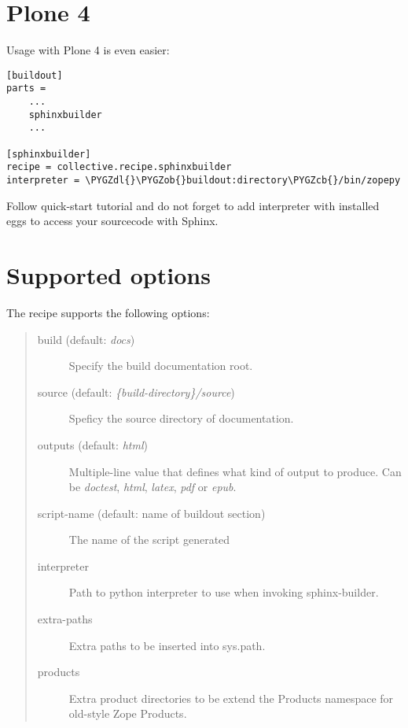 \documentclass[letterpaper,10pt,english]{sphinxmanual}
\def\PYGZob{\char`\{}
\def\PYGZcb{\char`\}}
\def\PYGZdl{\char`\$}
\begin{document}
\section{Plone 4}
\label{quick_start:plone-4}
Usage with Plone 4 is even easier:

\begin{Verbatim}[commandchars=\\\{\}]
[buildout]
parts =
    ...
    sphinxbuilder
    ...

[sphinxbuilder]
recipe = collective.recipe.sphinxbuilder
interpreter = \PYGZdl{}\PYGZob{}buildout:directory\PYGZcb{}/bin/zopepy
\end{Verbatim}

Follow quick-start tutorial and do not forget to add interpreter with
installed eggs to access your sourcecode with Sphinx.


\section{Supported options}
\label{options:supported-options}\label{options::doc}
The recipe supports the following options:
\begin{quote}
\begin{description}
\item[{build (default: \emph{docs})}] \leavevmode
Specify the build documentation root.

\item[{source (default: \emph{\{build-directory\}/source})}] \leavevmode
Speficy the source directory of documentation.

\item[{outputs (default: \emph{html})}] \leavevmode
Multiple-line value that defines what kind of output to produce.
Can be \emph{doctest}, \emph{html}, \emph{latex}, \emph{pdf} or \emph{epub}.

\item[{script-name (default: name of buildout section)}] \leavevmode
The name of the script generated

\item[{interpreter}] \leavevmode
Path to python interpreter to use when invoking sphinx-builder.

\item[{extra-paths}] \leavevmode
Extra paths to be inserted into sys.path.

\item[{products}] \leavevmode
Extra product directories to be extend the Products namespace for
old-style Zope Products.

\end{description}
\end{quote}
\end{document}

